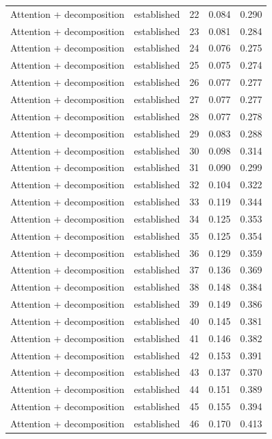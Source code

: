 \begin{tabular}{llrrr}
Attention + decomposition & established & 22 & 0.084 & 0.290 \\
Attention + decomposition & established & 23 & 0.081 & 0.284 \\
Attention + decomposition & established & 24 & 0.076 & 0.275 \\
Attention + decomposition & established & 25 & 0.075 & 0.274 \\
Attention + decomposition & established & 26 & 0.077 & 0.277 \\
Attention + decomposition & established & 27 & 0.077 & 0.277 \\
Attention + decomposition & established & 28 & 0.077 & 0.278 \\
Attention + decomposition & established & 29 & 0.083 & 0.288 \\
Attention + decomposition & established & 30 & 0.098 & 0.314 \\
Attention + decomposition & established & 31 & 0.090 & 0.299 \\
Attention + decomposition & established & 32 & 0.104 & 0.322 \\
Attention + decomposition & established & 33 & 0.119 & 0.344 \\
Attention + decomposition & established & 34 & 0.125 & 0.353 \\
Attention + decomposition & established & 35 & 0.125 & 0.354 \\
Attention + decomposition & established & 36 & 0.129 & 0.359 \\
Attention + decomposition & established & 37 & 0.136 & 0.369 \\
Attention + decomposition & established & 38 & 0.148 & 0.384 \\
Attention + decomposition & established & 39 & 0.149 & 0.386 \\
Attention + decomposition & established & 40 & 0.145 & 0.381 \\
Attention + decomposition & established & 41 & 0.146 & 0.382 \\
Attention + decomposition & established & 42 & 0.153 & 0.391 \\
Attention + decomposition & established & 43 & 0.137 & 0.370 \\
Attention + decomposition & established & 44 & 0.151 & 0.389 \\
Attention + decomposition & established & 45 & 0.155 & 0.394 \\
Attention + decomposition & established & 46 & 0.170 & 0.413 \\

\end{tabular}
